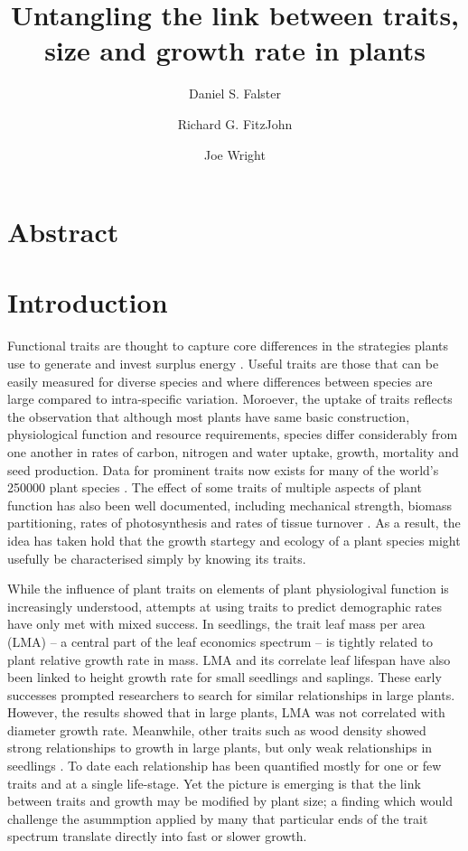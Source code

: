 \documentclass[12pt, a4paper]{article}
\title{\LARGE Untangling the link between traits, size and growth rate in plants}
\author[1]{Daniel S. Falster}
\author[1]{Richard G. FitzJohn}
\author[2]{Joe Wright}
\affil[1]{{\footnotesize Biological Sciences, Macquarie University, North Ryde, NSW 2109, Australia}}
\affil[2]{{\footnotesize Center for Tropical Forest Science, Smithsonian Tropical Research Institute, Panama, Republic of Panama}}
\date{\vspace{-3em}}
\begin{document}
\maketitle
\thispagestyle{empty} %

\section*{Abstract}\label{abstract}

\section*{Introduction}\label{introduction}

Functional traits are thought to capture core differences in the strategies
plants use to generate and invest surplus energy
\citep{wright_world-wide_2004,chave_towards_2009,westoby_plant_2002}. Useful
traits are those that
can be easily measured for diverse species and where differences between
species are large compared to intra-specific variation. Moroever, the uptake
of traits reflects the observation that although most plants have same basic
construction, physiological function and resource requirements, species differ
considerably from one another in rates of carbon, nitrogen and water uptake,
growth, mortality and seed production. Data for prominent traits now exists
for many of the world's 250000 plant species \citep{cornwell_functional_2014}.
The effect of some traits of multiple aspects of plant function has also been
well documented, including mechanical strength, biomass partitioning, rates of
photosynthesis and rates of tissue turnover
\citep {wright_world-wide_2004,chave_towards_2009}. As a result, the idea has
taken hold that the growth startegy and ecology of a plant species might usefully
be characterised simply by knowing its traits.

While the influence of plant traits on elements of plant physiologival
function is increasingly understood, attempts at using traits to predict
demographic rates have only met with mixed success. In seedlings, the trait
leaf mass per area (LMA) -- a central part of the leaf economics spectrum --
is tightly related to plant relative growth rate in mass. LMA and its
correlate leaf lifespan have also been linked to height growth rate for small
seedlings and saplings. These early successes prompted researchers to search
for similar relationships in large plants. However, the results showed that in
large plants, LMA was not correlated with diameter growth rate. Meanwhile,
other traits such as wood density showed strong relationships
to growth in large plants, but only weak relationships in seedlings \citep
{castro-diez_stem_1998}. To date each relationship has been quantified mostly for
one or few traits and at a single life-stage. Yet the picture is emerging is that the
link between traits and growth may be modified by plant size; a finding which would
challenge the asummption applied by many that particular ends of the trait spectrum
translate directly into fast or slower growth.
\end{document}
